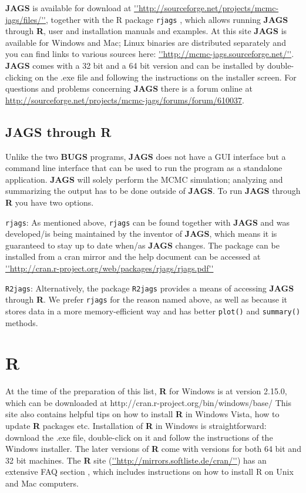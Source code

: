 {\bf JAGS} is available for download at \url{''http://sourceforge.net/projects/mcmc-jags/files/''}, together with the R package \mbox{\tt rjags} \citep{plummer:2011}, which allows running {\bf JAGS} through {\bf R}, user and installation manuals and examples. At this site {\bf JAGS} is available for Windows and Mac; Linux binaries are distributed separately and you can find links to various sources here: \url{''http://mcmc-jags.sourceforge.net/''}. {\bf JAGS} comes with a 32 bit and a 64 bit version and can be installed by double-clicking on the .exe file and following the instructions on the installer screen. For questions and problems concerning {\bf JAGS} there is a forum online at 
\url{http://sourceforge.net/projects/mcmc-jags/forums/forum/610037}.

\subsection{JAGS through R}
Unlike the two {\bf BUGS} programs, {\bf JAGS} does not have a GUI interface but a command line interface that can be used to run the program as a standalone application. {\bf JAGS} will solely perform the MCMC simulation; analyzing and summarizing the output has to be done outside of {\bf JAGS}. To run {\bf JAGS} through {\bf R} you have two options.
 
{\flushleft \tt rjags}:
 As mentioned above, \mbox{\tt rjags} \citep{plummer:2011} can be found together with {\bf JAGS} and was developed/is being maintained by the inventor of {\bf JAGS}, which means it is guaranteed to stay up to date when/as {\bf JAGS} changes. The package can be installed from a cran mirror and the help document can be accessed at \url{''http://cran.r-project.org/web/packages/rjags/rjags.pdf''}
 
{\flushleft \tt R2jags}:
 Alternatively, the package \mbox{\tt R2jags} \citep{su_yajima:2011} provides a means of accessing {\bf JAGS} through {\bf R}. We prefer \mbox{\tt rjags} for the reason named above, as well as because it stores data in a more memory-efficient way and has better \mbox{\tt plot()} and \mbox{\tt summary()} methods. 



\section{R}
At the time of the preparation of this list, {\bf R} for Windows is at version 2.15.0, which can be downloaded at http://cran.r-project.org/bin/windows/base/ 
This site also contains helpful tips on how to install {\bf R} in Windows Vista, how to update {\bf R} packages etc. 
Installation of {\bf R} in Windows is straightforward: download the .exe file, double-click on it and follow the instructions of the Windows installer. The later versions of {\bf R} come with versions for both 64 bit and 32 bit machines. 
The {\bf R} site (\url{''http://mirrors.softliste.de/cran/''}) has an extensive FAQ section \citet{hornik:2011}, which includes instructions on how to install R on Unix and Mac computers.  

